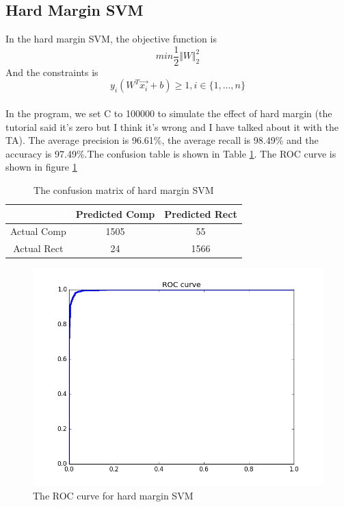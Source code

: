 \documentclass{article}
\begin{document}
\subsection{Hard Margin SVM}
In the hard margin SVM, the objective function is
\begin{equation*}
min \frac{1}{2}\Vert W \Vert _2 ^2
\end{equation*}
And the constraints is
\begin{equation*}
y_i(W^T\overrightarrow{x_i}+b)\geq 1, i\in\lbrace 1, ..., n \rbrace
\end{equation*}
\\
In the program, we set C to 100000 to simulate the effect of hard margin (the tutorial said it's zero but I think it's wrong and I have talked about it with the TA). The average precision is 96.61\%, the average recall is 98.49\% and the accuracy is 97.49\%.The confusion table is shown in Table \ref{tb:confu}. The ROC curve  is shown in figure \ref{fig:roc_hard}
\begin{table}
\begin{center}
\caption{The confusion matrix of hard margin SVM}
\label{tb:confu}
\begin{tabular}{|c|c|c|}
\hline
& Predicted Comp& Predicted Rect\\
\hline
Actual Comp&1505&55\\
\hline
Actual Rect&24&1566\\
\hline 	
\end{tabular}
\end{center}
\end{table}

\begin{figure}[htbp]
\centering
\includegraphics[width=.6\textwidth]{roc_hard.png}
\caption{The ROC curve for hard margin SVM}
\label{fig:roc_hard}
\end{figure}
\end{document}
